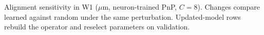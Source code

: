 \begin{table}[t]
\centering\small
\coltab{}
\caption{Alignment sensitivity in W1 ($\mu$m, neuron-trained PnP, $C=8$). Changes compare learned against random under the same perturbation. Updated-model rows rebuild the operator and reselect parameters on validation.}
\label{tab:s:profilealignment}
\end{table}

\FloatBarrier
